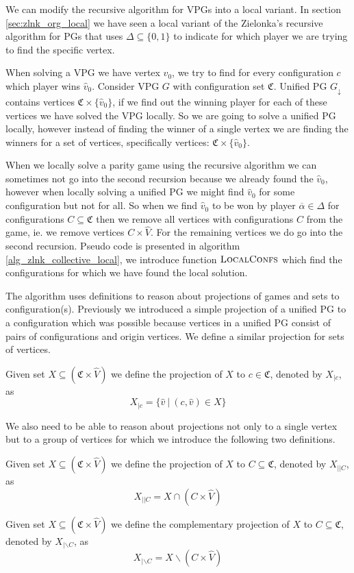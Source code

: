 We can modify the recursive algorithm for VPGs into a local variant. In section \ref{sec:zlnk_org_local} we have seen a local variant of the Zielonka's recursive algorithm for PGs that uses $\Delta \subseteq \{0,1\}$ to indicate for which player we are trying to find the specific vertex.

When solving a VPG we have vertex $\hat{v}_0$, we try to find for every configuration $c$ which player wins $\hat{v}_0$. Consider VPG $G$ with configuration set $\mathfrak{C}$. Unified PG $G_{\downarrow}$ contains vertices $\mathfrak{C} \times \{\hat{v}_0\}$, if we find out the winning player for each of these vertices we have solved the VPG locally. So we are going to solve a unified PG locally, however instead of finding the winner of a single vertex we are finding the winners for a set of vertices, specifically vertices: $\mathfrak{C} \times \{\hat{v}_0\}$.

When we locally solve a parity game using the recursive algorithm we can sometimes not go into the second recursion because we already found the $\hat{v}_0$, however when locally solving a unified PG we might find $\hat{v}_0$ for some configuration but not for all. So when we find $\hat{v}_0$ to be won by player $\overline{\alpha} \in \Delta$ for configurations $C \subseteq \mathfrak{C}$ then we remove all vertices with configurations $C$ from the game, ie. we remove vertices $C \times \hat{V}$. For the remaining vertices we do go into the second recursion. Pseudo code is presented in algorithm \ref{alg_zlnk_collective_local}, we introduce function $\textsc{LocalConfs}$ which find the configurations for which we have found the local solution.

The algorithm uses definitions to reason about projections of games and sets to configuration(s). Previously we introduced a simple projection of a unified PG to a configuration which was possible because vertices in a unified PG consist of pairs of configurations and origin vertices. We define a similar projection for sets of vertices.
\begin{definition}
	Given set $X \subseteq (\mathfrak{C} \times \hat{V})$ we define the projection of $X$ to $c \in \mathfrak{C}$, denoted by $X_{|c}$, as
	\[ X_{|c} = \{ \hat{v}\ |\ (c,\hat{v}) \in X \}\]
\end{definition}
We also need to be able to reason about projections not only to a single vertex but to a group of vertices for which we introduce the following two definitions.
\begin{definition}
	Given set $X \subseteq (\mathfrak{C} \times \hat{V})$ we define the projection of $X$ to $C \subseteq \mathfrak{C}$, denoted by $X_{||C}$, as
	\[ X_{||C} = X \cap (C \times \hat{V}) \]
\end{definition}
\begin{definition}
Given set $X \subseteq (\mathfrak{C} \times \hat{V})$ we define the complementary projection of $X$ to $C \subseteq \mathfrak{C}$, denoted by $X_{|\backslash C}$, as
\[ X_{|\backslash C} = X \backslash (C \times \hat{V}) \]
\end{definition}

